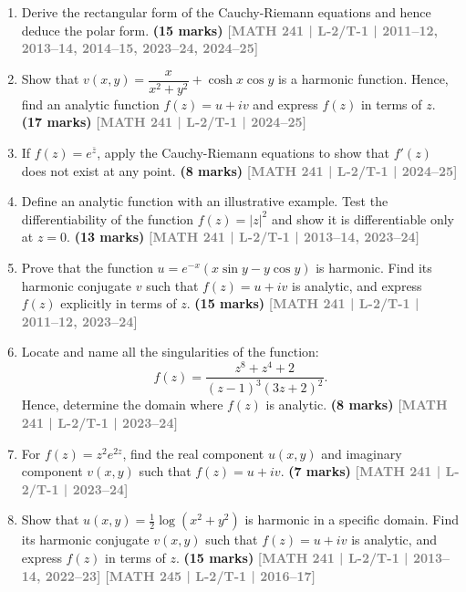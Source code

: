 \documentclass[12pt]{article}
\newcommand{\yr}[1]{\hfill\textcolor{gray}{\small\textbf{[#1]}}}
\newcommand{\mk}[1]{\textcolor{orange!70!black}{\small\textbf{(#1 marks)}}}
\begin{document}
\begin{enumerate}

\item Derive the rectangular form of the Cauchy-Riemann equations and hence deduce the polar form.
\mk{15} \yr{MATH 241 | L-2/T-1 | 2011--12, 2013--14, 2014--15, 2023--24, 2024--25}




\item Show that $v(x,y)=\dfrac{x}{x^{2}+y^{2}}+\cosh x\cos y$ is a harmonic function. Hence, find an analytic function $f(z)=u+iv$ and express $f(z)$ in terms of $z$.
\mk{17} \yr{MATH 241 | L-2/T-1 | 2024--25}



\item If $f(z)=e^{\bar{z}}$, apply the Cauchy-Riemann equations to show that $f'(z)$ does not exist at any point.
\mk{8} \yr{MATH 241 | L-2/T-1 | 2024--25}




\item Define an analytic function with an illustrative example. Test the differentiability of the function $f(z)=|z|^{2}$ and show it is differentiable only at $z=0$.
\mk{13} \yr{MATH 241 | L-2/T-1 | 2013--14, 2023--24}




\item Prove that the function $u=e^{-x}(x\sin y - y\cos y)$ is harmonic. Find its harmonic conjugate $v$ such that $f(z)=u+iv$ is analytic, and express $f(z)$ explicitly in terms of $z$.
\mk{15} \yr{MATH 241 | L-2/T-1 | 2011--12, 2023--24}



\item Locate and name all the singularities of the function:
\[
f(z)=\frac{z^{8}+z^{4}+2}{(z-1)^{3}(3z+2)^{2}}.
\]
Hence, determine the domain where $f(z)$ is analytic.
\mk{8} \yr{MATH 241 | L-2/T-1 | 2023--24}





\item For $f(z)=z^{2}e^{2z}$, find the real component $u(x,y)$ and imaginary component $v(x,y)$ such that $f(z)=u+iv$.
\mk{7} \yr{MATH 241 | L-2/T-1 | 2023--24}



\item Show that $u(x,y)=\tfrac{1}{2}\log(x^{2}+y^{2})$ is harmonic in a specific domain. Find its harmonic conjugate $v(x,y)$ such that $f(z)=u+iv$ is analytic, and express $f(z)$ in terms of $z$.
\mk{15} \yr{MATH 241 | L-2/T-1 | 2013--14, 2022--23} \yr{MATH 245 | L-2/T-1 | 2016--17}







\end{enumerate}
\end{document}
